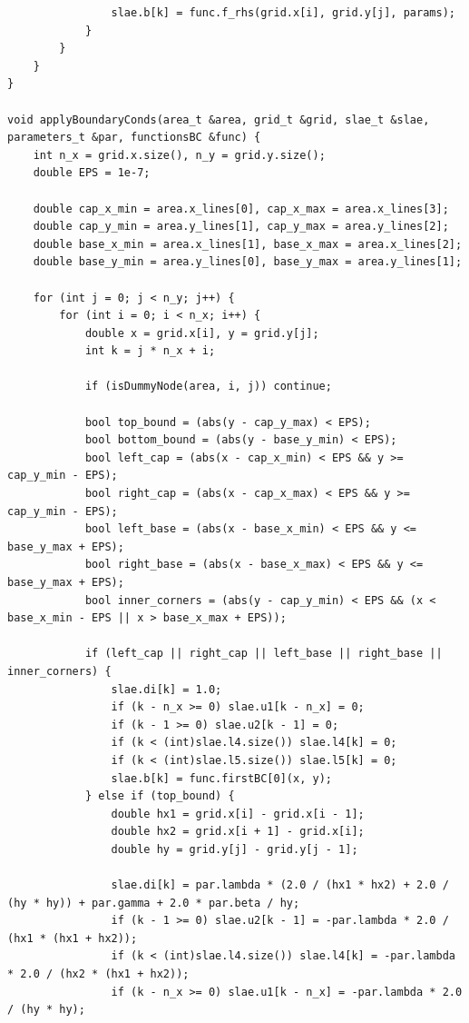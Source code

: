 \documentclass[a4paper,12pt]{article}
\begin{document}
\begin{lstlisting}
                slae.b[k] = func.f_rhs(grid.x[i], grid.y[j], params);
            }
        }
    }
}

void applyBoundaryConds(area_t &area, grid_t &grid, slae_t &slae, parameters_t &par, functionsBC &func) {
    int n_x = grid.x.size(), n_y = grid.y.size();
    double EPS = 1e-7;

    double cap_x_min = area.x_lines[0], cap_x_max = area.x_lines[3];
    double cap_y_min = area.y_lines[1], cap_y_max = area.y_lines[2];
    double base_x_min = area.x_lines[1], base_x_max = area.x_lines[2];
    double base_y_min = area.y_lines[0], base_y_max = area.y_lines[1];

    for (int j = 0; j < n_y; j++) {
        for (int i = 0; i < n_x; i++) {
            double x = grid.x[i], y = grid.y[j];
            int k = j * n_x + i;

            if (isDummyNode(area, i, j)) continue;

            bool top_bound = (abs(y - cap_y_max) < EPS);
            bool bottom_bound = (abs(y - base_y_min) < EPS);
            bool left_cap = (abs(x - cap_x_min) < EPS && y >= cap_y_min - EPS);
            bool right_cap = (abs(x - cap_x_max) < EPS && y >= cap_y_min - EPS);
            bool left_base = (abs(x - base_x_min) < EPS && y <= base_y_max + EPS);
            bool right_base = (abs(x - base_x_max) < EPS && y <= base_y_max + EPS);
            bool inner_corners = (abs(y - cap_y_min) < EPS && (x < base_x_min - EPS || x > base_x_max + EPS));

            if (left_cap || right_cap || left_base || right_base || inner_corners) {
                slae.di[k] = 1.0;
                if (k - n_x >= 0) slae.u1[k - n_x] = 0;
                if (k - 1 >= 0) slae.u2[k - 1] = 0;
                if (k < (int)slae.l4.size()) slae.l4[k] = 0;
                if (k < (int)slae.l5.size()) slae.l5[k] = 0;
                slae.b[k] = func.firstBC[0](x, y);
            } else if (top_bound) {
                double hx1 = grid.x[i] - grid.x[i - 1];
                double hx2 = grid.x[i + 1] - grid.x[i];
                double hy = grid.y[j] - grid.y[j - 1];
                
                slae.di[k] = par.lambda * (2.0 / (hx1 * hx2) + 2.0 / (hy * hy)) + par.gamma + 2.0 * par.beta / hy;
                if (k - 1 >= 0) slae.u2[k - 1] = -par.lambda * 2.0 / (hx1 * (hx1 + hx2));
                if (k < (int)slae.l4.size()) slae.l4[k] = -par.lambda * 2.0 / (hx2 * (hx1 + hx2));
                if (k - n_x >= 0) slae.u1[k - n_x] = -par.lambda * 2.0 / (hy * hy);
                

\end{lstlisting}
\end{document}
